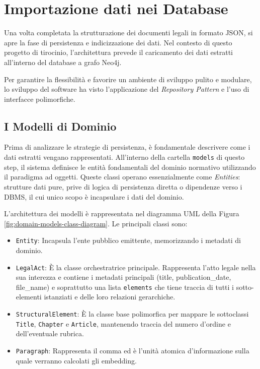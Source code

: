 \section{Importazione dati nei Database}
\label{sec:database_ingestion}

Una volta completata la strutturazione dei documenti legali in formato JSON, si apre la fase di persistenza e indicizzazione dei dati. Nel contesto di questo progetto di tirocinio, l'architettura prevede il caricamento dei dati estratti all'interno del database a grafo Neo4j.

Per garantire la flessibilità e favorire un ambiente di sviluppo pulito e modulare, lo sviluppo del software ha visto l'applicazione del \textit{Repository Pattern} e l'uso di interfacce polimorfiche.

\subsection{I Modelli di Dominio}
\label{sec:modelli_dominio}
Prima di analizzare le strategie di persistenza, è fondamentale descrivere come i dati estratti vengano rappresentati. All'interno della cartella \texttt{models} di questo step, il sistema definisce le entità fondamentali del dominio normativo utilizzando il paradigma ad oggetti. Queste classi operano essenzialmente come \textit{Entities}: strutture dati pure, prive di logica di persistenza diretta o dipendenze verso i DBMS, il cui unico scopo è incapsulare i dati del dominio.

L'architettura dei modelli è rappresentata nel diagramma UML della Figura \ref{fig:domain-models-class-diagram}. Le principali classi sono:
\begin{itemize}
    \item \texttt{Entity}: Incapsula l'ente pubblico emittente, memorizzando i metadati di dominio.
    \item \texttt{LegalAct}: È la classe orchestratrice principale. Rappresenta l'atto legale nella sua interezza e contiene i metadati principali (title, publication\_date, file\_name) e soprattutto una lista \texttt{elements} che tiene traccia di tutti i sotto-elementi istanziati e delle loro relazioni gerarchiche.
    \item \texttt{StructuralElement}: È la classe base polimorfica per mappare le sottoclassi \texttt{Title}, \texttt{Chapter} e \texttt{Article}, mantenendo traccia del numero d'ordine e dell'eventuale rubrica.
    \item \texttt{Paragraph}: Rappresenta il comma ed è l'unità atomica d'informazione sulla quale verranno calcolati gli embedding.
\end{itemize}

